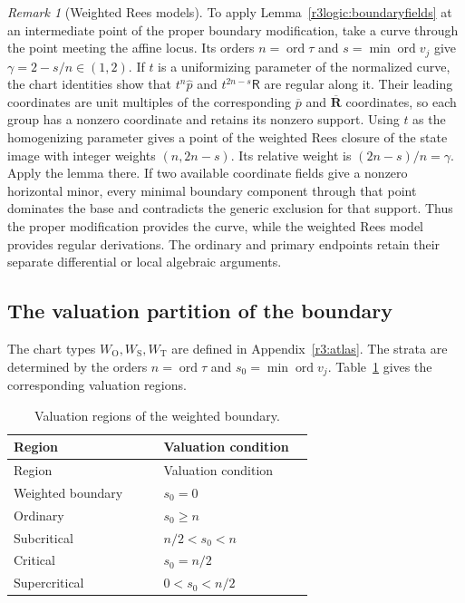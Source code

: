 \documentclass[11pt,a4paper]{article}
\numberwithin{equation}{section}
\theoremstyle{plain}
\theoremstyle{definition}
\theoremstyle{remark}
\newtheorem{remark}[theorem]{Remark}
\begin{document}
\begin{remark}[Weighted Rees models]
To apply Lemma~\ref{r3logic:boundaryfields} at an intermediate point
of the proper boundary modification, take a curve through
the point meeting the affine locus. Its orders
$n=\operatorname{ord}\tau$ and $s=\min\operatorname{ord}v_j$ give
$\gamma=2-s/n\in(1,2)$. If $t$ is a uniformizing parameter of the
normalized curve, the chart identities show that
$t^n\widehat p$ and $t^{2n-s}\mathsf R$ are regular along it.
Their leading coordinates are unit multiples of the corresponding
$\overline p$ and $\overline{\boldsymbol R}$ coordinates, so each group
has a nonzero coordinate and retains its nonzero support.
Using $t$ as the homogenizing parameter gives a point of the weighted Rees closure of the state image with integer weights $(n,2n-s)$.
Its relative weight is $(2n-s)/n=\gamma$. Apply the lemma there.
If two available coordinate fields give a nonzero horizontal minor, every
minimal boundary component through that point dominates the base and
contradicts the generic exclusion for that support. Thus the proper
modification provides the curve, while the weighted Rees
model provides regular derivations. The ordinary and primary endpoints
retain their separate differential or local algebraic arguments.
\end{remark}

\subsection{The valuation partition of the boundary}
\label{appr3:valuationpartition}

The chart types $W_{\mathrm O},W_{\mathrm S},W_{\mathrm T}$ are defined in Appendix~\ref{r3:atlas}.
The strata are determined by the orders $n=\operatorname{ord}\tau$
and $s_0=\min\operatorname{ord}v_j$.
Table~\ref{tab:r3-valuations} gives the corresponding valuation regions.

\begin{longtable}{@{}p{0.46\linewidth}p{0.46\linewidth}@{}}
\caption{Valuation regions of the weighted boundary.}\label{tab:r3-valuations}\\
\toprule Region & Valuation condition\\\midrule\endfirsthead
\toprule Region & Valuation condition\\\midrule\endhead
Weighted boundary & $s_0=0$\\
Ordinary & $s_0\ge n$\\
Subcritical & $n/2<s_0<n$\\
Critical & $s_0=n/2$\\
Supercritical & $0<s_0<n/2$\\
\bottomrule\end{longtable}
\end{document}
